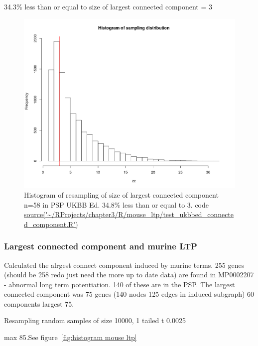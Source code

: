 
34.3\% less than or equal to size of largest connected component = 3

\begin{figure}
    \centering
    \includegraphics[width=\textwidth]{images/chapter3/connected_components/Rplot_ukbbed.png}
    \caption{Histogram of resampling of size of largest connected component n=58 in PSP UKBB Ed. 34.8\% less than or equal to 3. code \url{source('~/RProjects/chapter3/R/mouse_ltp/test_ukbbed_connected_component.R')}}
    \label{fig:my_label}
\end{figure}

 \subsubsection{Largest connected component and murine LTP}

Calculated the alrgest connect component induced by murine terms. 255 genes (should be 258 redo just need the more up to date data) are found in MP0002207 - abnormal long term potentiation. 140 of these are in the PSP. The largest connected component was 75 genes (140 nodes 125 edges in induced subgraph) 60 components largest 75. 

Resampling random samples of size 10000, 1 tailed t 0.0025

max 85.See figure~\ref{fig:histogram mouse ltp}

